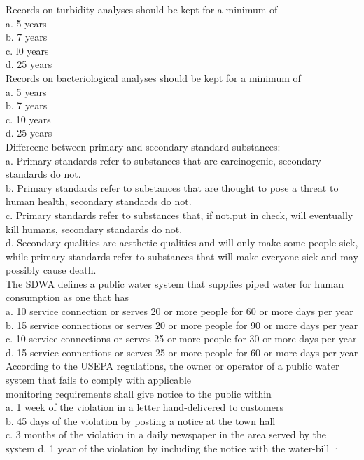 Records on turbidity analyses should be kept for a minimum of\\
a.	5 years\\
b.	7 years\\
c.	l0 years\\
d.	25 years\\

Records on bacteriological analyses should be kept for a minimum of\\
a.	5 years\\
b.	7 years\\
c.	10 years\\
d.	25 years\\

Differecne between primary and secondary standard substances:\\
a.	Primary standards refer to substances that are carcinogenic, secondary standards do not.\\
b.	Primary standards refer to substances that are thought to pose a threat to human health, secondary standards do not.\\
c.	Primary standards refer to substances that, if not.put in check, will eventually kill humans, secondary standards do not.\\
d.	Secondary qualities are aesthetic qualities and will only make some people sick, while primary standards refer to substances that will make everyone sick and may possibly cause death.\\

The SDWA defines a public water system that supplies piped water for human consumption as one that has\\
a.	10 service connection or serves 20 or more people for 60 or more days per year\\
b.	15 service connections or serves 20 or more people for 90 or more days per year\\
c.	10 service connections or serves 25 or more people for 30 or more days per year\\
d.	15 service connections or serves 25 or more people for 60 or more days per year\\

According to the USEPA regulations, the owner or operator of a public water system that fails to comply with applicable\\
monitoring requirements shall give notice to the public within\\
a.	1 week of the violation in a letter hand-delivered to customers\\
b.	45 days of the violation by posting a notice at the town hall\\
c. 	3 months of the violation in a daily newspaper in the area served by the system 
d.  1 year of the violation by including the notice with the water-bill ·\\

